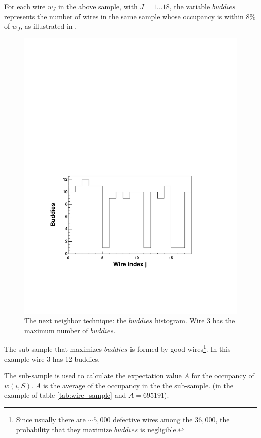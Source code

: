 For each wire $w_J$ in the above sample, with $J=1...18$, 
the variable $buddies$ represents the number of wires in the same sample whose occupancy is within $8\%$ of $w_J$,
as illustrated in .
\begin{figure}[h]
 \begin{center}
 \includegraphics[width = 13cm, bb=0 120 580 420]{acceptance/img/buddies} 
  \caption[The next neighbor technique: the $buddies$ histogram]
          { The next neighbor technique: the $buddies$ histogram. Wire $3$ has the maximum number of $buddies$.}
 \label{fig:buddies}
 \end{center}
\end{figure} 

The sub-sample that maximizes $buddies$ is formed by good wires\footnote{Since 
usually there are $\sim 5,000$ defective wires among the $36,000$, the probability that 
they maximize $buddies$ is negligible. }. 
In this example wire 3 has 12 buddies.

The sub-sample is used to calculate the expectation value $A$ for the occupancy of $w(i,S)$. $A$ is the average
of the occupancy in the the sub-sample.
(in the example of table \ref{tab:wire_sample}
and  $A = 695191$).

